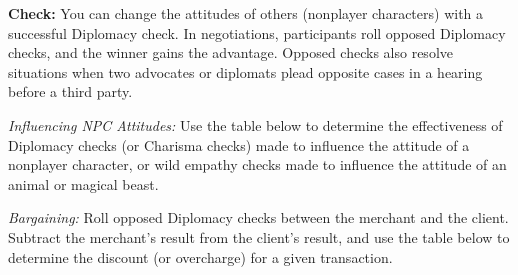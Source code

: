 \textbf{Check:} You can change the attitudes of others (nonplayer characters) with a successful Diplomacy check. In negotiations, participants roll opposed Diplomacy checks, and the winner gains the advantage. Opposed checks also resolve situations when two advocates or diplomats plead opposite cases in a hearing before a third party.

\textit{Influencing NPC Attitudes:} Use the table below to determine the effectiveness of Diplomacy checks (or Charisma checks) made to influence the attitude of a nonplayer character, or wild empathy checks made to influence the attitude of an animal or magical beast.



\textit{Bargaining:} Roll opposed Diplomacy checks between the merchant and the client. Subtract the merchant's result from the client's result, and use the table below to determine the discount (or overcharge) for a given transaction. %

